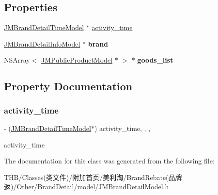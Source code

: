 \subsection*{Properties}
\begin{DoxyCompactItemize}
\item 
\mbox{\hyperlink{interface_j_m_brand_detail_time_model}{J\+M\+Brand\+Detail\+Time\+Model}} $\ast$ \mbox{\hyperlink{interface_j_m_brand_detail_model_a7aeb36e6bda1da2927e9fcf829545804}{activity\+\_\+time}}
\item 
\mbox{\label{interface_j_m_brand_detail_model_ac46f5fc71a0f167619582e8102bf3268}} 
\mbox{\hyperlink{interface_j_m_brand_detail_info_model}{J\+M\+Brand\+Detail\+Info\+Model}} $\ast$ {\bfseries brand}
\item 
\mbox{\label{interface_j_m_brand_detail_model_ad431e33839bf329f6e494cf0b62c60cd}} 
N\+S\+Array$<$ \mbox{\hyperlink{interface_j_m_public_product_model}{J\+M\+Public\+Product\+Model}} $\ast$ $>$ $\ast$ {\bfseries goods\+\_\+list}
\end{DoxyCompactItemize}


\subsection{Property Documentation}
\mbox{\label{interface_j_m_brand_detail_model_a7aeb36e6bda1da2927e9fcf829545804}} 
\subsubsection{\texorpdfstring{activity\+\_\+time}{activity\_time}}
{\footnotesize\ttfamily -\/ (\mbox{\hyperlink{interface_j_m_brand_detail_time_model}{J\+M\+Brand\+Detail\+Time\+Model}}$\ast$) activity\+\_\+time\hspace{0.3cm}{\ttfamily [read]}, {\ttfamily [write]}, {\ttfamily [nonatomic]}, {\ttfamily [strong]}}

activity\+\_\+time 

The documentation for this class was generated from the following file\+:\begin{DoxyCompactItemize}
\item 
T\+H\+B/\+Classes(类文件)/附加首页/美利淘/\+Brand\+Rebate(品牌返)/\+Other/\+Brand\+Detail/model/J\+M\+Brand\+Detail\+Model.\+h\end{DoxyCompactItemize}
